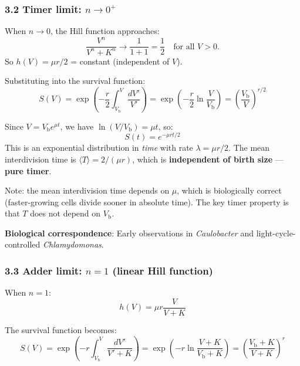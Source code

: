 \documentclass[11pt]{article}
\newcommand{\Vb}{V_{\mathrm{b}}}
\begin{document}
\subsubsection*{3.2 Timer limit: $n \to 0^+$}

When $n \to 0$, the Hill function approaches:
\begin{equation}
  \frac{V^n}{V^n + K^n} \to \frac{1}{1 + 1} = \frac{1}{2} \quad \text{for all } V > 0.
\end{equation}
So $h(V) = \mu r / 2$ = constant (independent of $V$).

Substituting into the survival function:
\begin{equation}
  S(V) = \exp\!\left(-\frac{r}{2}\int_{\Vb}^{V}\frac{dV'}{V'}\right)
       = \exp\!\left(-\frac{r}{2}\ln\frac{V}{\Vb}\right)
       = \left(\frac{\Vb}{V}\right)^{r/2}
\end{equation}

Since $V = \Vb e^{\mu t}$, we have $\ln(V/\Vb) = \mu t$, so:
\begin{equation}
  S(t) = e^{-\mu r t / 2}
\end{equation}
This is an exponential distribution in \emph{time} with rate $\lambda = \mu r / 2$.
The mean interdivision time is $\langle T \rangle = 2/(\mu r)$, which is
\textbf{independent of birth size} --- \textbf{pure timer}.

Note: the mean interdivision time depends on $\mu$, which is biologically
correct (faster-growing cells divide sooner in absolute time). The key timer
property is that $T$ does not depend on $\Vb$.

\textbf{Biological correspondence}: Early observations in \textit{Caulobacter}
and light-cycle-controlled \textit{Chlamydomonas}.

\subsubsection*{3.3 Adder limit: $n = 1$ (linear Hill function)}

When $n = 1$:
\begin{equation}
  h(V) = \mu r \frac{V}{V + K}
\end{equation}

The survival function becomes:
\begin{equation}
  S(V) = \exp\!\left(-r \int_{\Vb}^{V} \frac{dV'}{V' + K}\right)
       = \exp\!\left(-r \ln\frac{V + K}{\Vb + K}\right)
       = \left(\frac{\Vb + K}{V + K}\right)^r
\end{equation}
\end{document}
